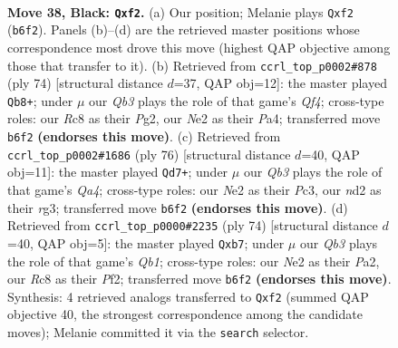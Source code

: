 \documentclass[11pt]{article}
\begin{document}
\clearpage

\begin{figure}[p]\centering
\begin{subfigure}{0.46\textwidth}\centering
\resizebox{\linewidth}{!}{%
\newchessgame
\chessboard[
  setfen={2r3k1/1p3p2/1q4p1/p7/7p/3Q3P/P2NnPP1/b6K b - - 4 38},
  showmover=false,
  pgfstyle=straightmove, color=movearrow, markmove={b6-f2}
]}
\caption{}
\end{subfigure}\hfill
\begin{subfigure}{0.46\textwidth}\centering
\resizebox{\linewidth}{!}{%
\newchessgame
\chessboard[
  setfen={7k/5pp1/pp5p/8/PP3Q1P/1q6/5PPK/8 w - - 1 38},
  showmover=false,
  pgfstyle=straightmove, color=movearrow, markmove={f4-b8}
]}
\caption{}
\end{subfigure}
\\[4pt]
\begin{subfigure}{0.46\textwidth}\centering
\resizebox{\linewidth}{!}{%
\newchessgame
\chessboard[
  setfen={8/pk6/1p2p3/3pP2p/Q4P1P/2Pq2r1/PK3R2/8 w - - 4 39},
  showmover=false,
  pgfstyle=straightmove, color=movearrow, markmove={a4-d7}
]}
\caption{}
\end{subfigure}\hfill
\begin{subfigure}{0.46\textwidth}\centering
\resizebox{\linewidth}{!}{%
\newchessgame
\chessboard[
  setfen={6k1/pp3pp1/7p/P7/2q5/7P/P4PP1/1Q4K1 w - - 2 38},
  showmover=false,
  pgfstyle=straightmove, color=movearrow, markmove={b1-b7}
]}
\caption{}
\end{subfigure}
\caption{\textbf{Move 38, Black: \texttt{Qxf2}.} (a) Our position; Melanie plays \texttt{Qxf2} (\texttt{b6f2}). Panels (b)--(d) are the retrieved master positions whose correspondence most drove this move (highest QAP objective among those that transfer to it). (b) Retrieved from \texttt{ccrl\_top\_p0002\#878} (ply 74) [structural distance $d$=37, QAP obj=12]: the master played \texttt{Qb8+}; under $\mu$ our \emph{Qb3} plays the role of that game's \emph{Qf4}; cross-type roles: our \emph{R}c8 as their \emph{P}g2, our \emph{N}e2 as their \emph{P}a4; transferred move \texttt{b6f2} \textbf{(endorses this move)}. (c) Retrieved from \texttt{ccrl\_top\_p0002\#1686} (ply 76) [structural distance $d$=40, QAP obj=11]: the master played \texttt{Qd7+}; under $\mu$ our \emph{Qb3} plays the role of that game's \emph{Qa4}; cross-type roles: our \emph{N}e2 as their \emph{P}c3, our \emph{n}d2 as their \emph{r}g3; transferred move \texttt{b6f2} \textbf{(endorses this move)}. (d) Retrieved from \texttt{ccrl\_top\_p0000\#2235} (ply 74) [structural distance $d$=40, QAP obj=5]: the master played \texttt{Qxb7}; under $\mu$ our \emph{Qb3} plays the role of that game's \emph{Qb1}; cross-type roles: our \emph{N}e2 as their \emph{P}a2, our \emph{R}c8 as their \emph{P}f2; transferred move \texttt{b6f2} \textbf{(endorses this move)}. Synthesis: 4 retrieved analogs transferred to \texttt{Qxf2} (summed QAP objective 40, the strongest correspondence among the candidate moves); Melanie committed it via the \texttt{search} selector.}
\label{fig:thought-m75}
\end{figure}
\end{document}
